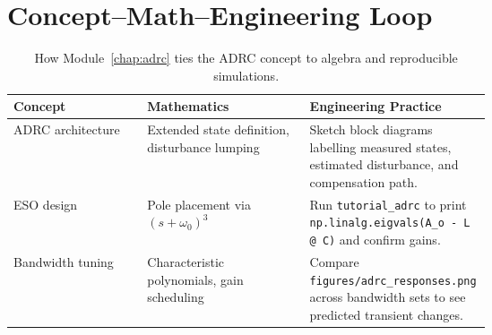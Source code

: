 \section{Concept--Math--Engineering Loop}
\begin{table}[h]
    \centering
    \small
    \renewcommand{\arraystretch}{1.2}
    \begin{tabularx}{\linewidth}{|>{\raggedright\arraybackslash}p{0.28\linewidth}|>{\raggedright\arraybackslash}p{0.34\linewidth}|>{\raggedright\arraybackslash}X|}
        \hline
        \textbf{Concept} & \textbf{Mathematics} & \textbf{Engineering Practice} \\
        \hline
        ADRC architecture & Extended state definition, disturbance lumping & Sketch block diagrams labelling measured states, estimated disturbance, and compensation path. \\
        \hline
        ESO design & Pole placement via $(s + \omega_0)^3$ & Run \texttt{tutorial\_adrc} to print \texttt{np.linalg.eigvals(A\_o - L @ C)} and confirm gains. \\
        \hline
        Bandwidth tuning & Characteristic polynomials, gain scheduling & Compare \texttt{figures/adrc\_responses.png} across bandwidth sets to see predicted transient changes. \\
        \hline
    \end{tabularx}
    \caption{How Module~\ref{chap:adrc} ties the ADRC concept to algebra and reproducible simulations.}
\end{table}

